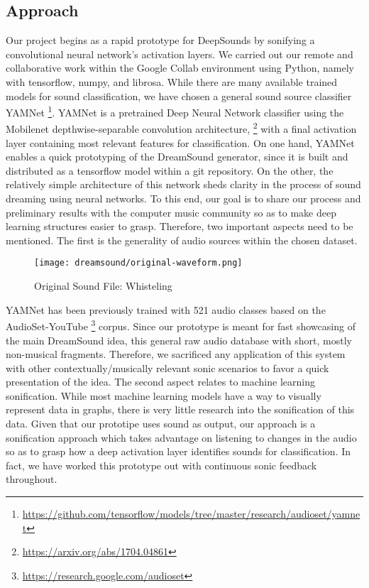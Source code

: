 \documentclass[a4paper,10pt,oneside]{article}
\begin{document}
\begin{sloppy}
\section{Approach}
Our project begins as a rapid prototype for DeepSounds by sonifying a convolutional neural network's activation layers. We carried out our remote and collaborative work within the Google Collab environment using Python, namely with tensorflow, numpy, and librosa. While there are many available trained models for sound classification, we have chosen a general sound source classifier YAMNet \footnote{\url{https://github.com/tensorflow/models/tree/master/research/audioset/yamnet}}. YAMNet is a pretrained Deep Neural Network classifier using the Mobilenet depthwise-separable convolution architecture, \footnote{\url{https://arxiv.org/abs/1704.04861}} with a final activation layer containing most relevant features for classification. On one hand, YAMNet enables a quick prototyping of the DreamSound generator, since it is built and distributed as a tensorflow model within a git repository. On the other, the relatively simple architecture of this network sheds clarity in the process of sound dreaming using neural networks. To this end, our goal is to share our process and preliminary results with the computer music community so as to make deep learning structures easier to grasp. Therefore, two important aspects need to be mentioned. The first is the generality of audio sources within the chosen dataset. 
\begin{figure*}[htbp]
       \centering
              \texttt{[image: dreamsound/original-waveform.png]}
       \caption{Original Sound File: Whisteling}
       \label{fig:img-0}
\end{figure*}
YAMNet has been previously trained with 521 audio classes based on the AudioSet-YouTube \footnote{\url{https://research.google.com/audioset}} corpus. Since our prototype is meant for fast showcasing of the main DreamSound idea, this general raw audio database with short, mostly non-musical fragments. Therefore, we sacrificed any application of this system with other contextually/musically relevant sonic scenarios to favor a quick presentation of the idea. The second aspect relates to machine learning sonification. While most machine learning models have a way to visually represent data in graphs, there is very little research into the sonification of this data. Given that our prototipe uses sound as output, our approach is a sonification approach which takes advantage on listening to changes in the audio so as to grasp how a deep activation layer identifies sounds for classification. In fact, we have worked this prototype out with continuous sonic feedback throughout.


\end{sloppy}
\end{document}
